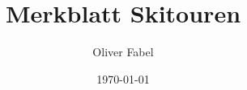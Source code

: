 \documentclass[12pt, landscape]{article}
\title{Merkblatt Skitouren}
\author{Oliver Fabel}
\date{\today}
\begin{document}
  \begin{multicols*}{3}[]
    
    
    
    
    
  \end{multicols*}
\end{document}

